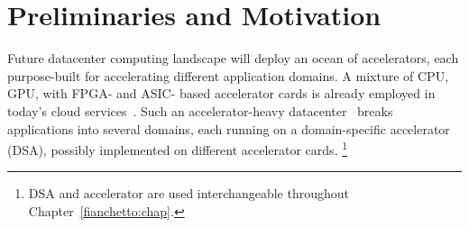 \section{Preliminaries and Motivation}%
\label{sec:motivation}

Future datacenter computing landscape will deploy an ocean of accelerators, each purpose-built for accelerating different 
application domains.
%
A mixture of CPU, GPU, with FPGA- and ASIC- based accelerator cards is already employed in today's cloud services~\cite{catapult:isca:2014, cloud-scale-acc:micro:2016, tpu:2017, brainwave:isca:2018, aws-inferentia:2019,tpuv4i:isca:2021,google-vcu:asplos:2021, aws-trainium:2022}.
%
Such an accelerator-heavy datacenter~\cite{asic-cloud:isca:2016, asic-cloud:cacm:2020} breaks applications into several domains, each running on a domain-specific accelerator (DSA), possibly implemented on different accelerator cards. \footnote{DSA and accelerator are used interchangeable throughout Chapter~\ref{fianchetto:chap}.} %
%

